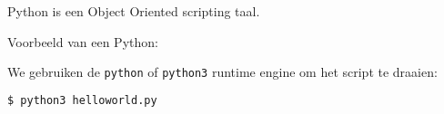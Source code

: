 Python is een Object Oriented scripting taal.

Voorbeeld van een Python:


We gebruiken de \texttt{python} of \texttt{python3} runtime engine om het script te draaien:
\begin{lstlisting}[language=bash]
$ python3 helloworld.py
\end{lstlisting}
